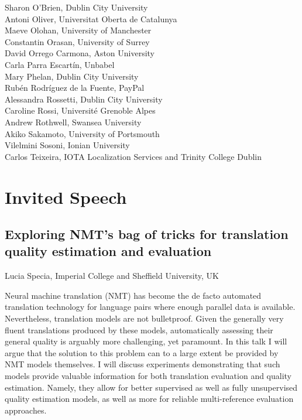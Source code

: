 \documentclass[a4paper,11pt,twoside]{book}
\newcommand{\newoddpage} {\clearpage
  \ifthenelse{\isodd{\value{page}}}{}
  {\thispagestyle{empty}\quad\newpage}}
\begin{document}
\noindent Sharon O'Brien, Dublin City University\\
\noindent Antoni Oliver, Universitat Oberta de Catalunya\\
\noindent Maeve	Olohan, University of Manchester\\
\noindent Constantin Orasan, University of Surrey\\
\noindent David Orrego Carmona, Aston University\\
\noindent Carla Parra Escartín, Unbabel\\
\noindent Mary Phelan, Dublin City University\\
\noindent Rubén Rodríguez de la Fuente, PayPal\\
\noindent Alessandra Rossetti, Dublin City University\\
\noindent Caroline Rossi, Université Grenoble Alpes\\
\noindent Andrew Rothwell, Swansea University\\
\noindent Akiko Sakamoto, University of Portsmouth\\
\noindent Vilelmini Sosoni, Ionian University\\
\noindent Carlos Teixeira, IOTA Localization Services and Trinity College Dublin


\newoddpage
\mainmatter

\chapter*{Invited Speech}

\section*{Exploring NMT's bag of tricks for translation quality estimation and evaluation}\label{invited}
Lucia Specia, Imperial College and Sheffield University, UK
\vspace{0.5cm}

\begin{onehalfspacing}

Neural machine translation (NMT) has become the de facto automated translation technology for language pairs where enough parallel data is available. Nevertheless, translation models are not bulletproof. Given the generally very fluent translations produced by these models, automatically assessing their general quality is arguably more challenging, yet paramount. In this talk I will argue that the solution to this problem can to a large extent be provided by NMT models themselves. I will discuss experiments demonstrating that such models provide valuable information for both translation evaluation and quality estimation. Namely, they allow for better supervised as well as fully unsupervised quality estimation models, as well as more for reliable multi-reference evaluation approaches.

\end{onehalfspacing}
\end{document}
